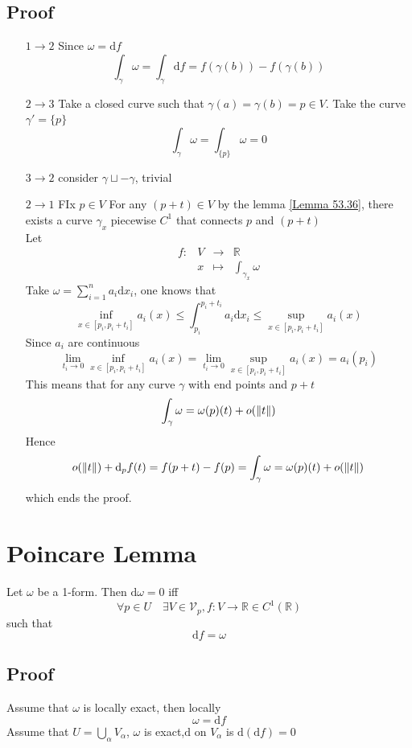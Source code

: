 \documentclass{book}
\begin{document}
\subsection*{Proof}
\begin{itemize}
    \item[$1\rightarrow 2$]Since $\omega=\text{d}f$
    $$\int_\gamma\omega=\int_\gamma\text{d}f=f(\gamma(b))-f(\gamma(b))$$
    \item[$2\rightarrow 3$]Take a closed curve such that $\gamma(a)=\gamma(b)=p\in V$. Take the curve $\gamma'=\{p\}$$$\int_\gamma\omega=\int_{\{p\}}\omega=0$$
    \item[$3\rightarrow 2$]consider $\gamma\sqcup-\gamma$, trivial
    \item[$2\rightarrow1$]
    FIx $p\in V$ For any $(p+t)\in V$ by the lemma \ref{Lemma 53.36}, there exists a curve $\gamma_x$ piecewise $C^1$ that connects $p$ and $(p+t)$\\
    Let$$\begin{aligned}
        f:&V&\rightarrow&\mathbb{R}\\
        &x&\mapsto&\int_{\gamma_x}\omega
    \end{aligned}$$
    Take $\omega=\sum\limits_{i=1}^na_i\text{d}x_i$, one knows that
    $$\inf\limits_{x\in [p_i,p_i+t_i]}a_i(x)\leq\int_{p_i}^{p_i+t_i}a_i\text{d}x_i\leq\sup\limits_{x\in [p_i,p_i+t_i]}a_i(x)$$ 
    Since $a_i$ are continuous$$\lim\limits_{t_i\rightarrow0}\inf\limits_{x\in [p_i,p_i+t_i]}a_i(x)=\lim\limits_{t_i\rightarrow0}\sup\limits_{x\in [p_i,p_i+t_i]}a_i(x)=a_i(p_i)$$
    This means that for any curve $\gamma$ with end points and $p+t$
    $$\int_\gamma\omega=\omega(p)(t)+o(\left\lVert t \right\rVert)$$
    Hence $$o(\left\lVert t \right\rVert)+\text{d}_pf(t)=f(p+t)-f(p)=\int_\gamma\omega=\omega(p)(t)+o(\left\lVert t \right\rVert)$$
    which ends the proof.
\end{itemize}
\section{Poincare Lemma}
\label{Poincare Lemma}
Let $\omega$ be a 1-form. Then $\text{d}\omega=0$ iff
$$\forall p\in U\quad \exists V\in \mathcal{V}_p,f:V\rightarrow\mathbb{R}\in C^1(\mathbb{R})$$such that $$\text{d}f=\omega$$
\subsection*{Proof}
Assume that $\omega$ is locally exact, then locally $$\omega=\text{d}f$$
Assume that $U=\bigcup\limits_\alpha V_\alpha$, $\omega$ is exact,$\text{d}$ on $V_\alpha$ is $\text{d}(\text{d}f)=0$
\end{document}
